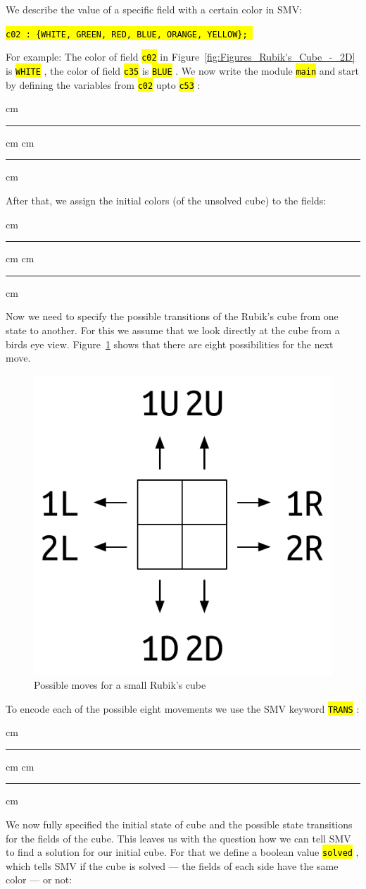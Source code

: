 \documentclass[a4paper, 11pt]{article}
\newcommand{\codeinput}[1]
{
    \vskip 0.3 cm
    {\color{lightgray}\hrule}\vskip 0.3 cm
    {\fontsize{9pt}{11pt}}
    \vskip 0.3 cm{\color{lightgray}\hrule}
    \vskip 0.3 cm
}
\newcommand{\code}[1]
{
    \hl{\texttt{#1}}
}
\begin{document}
We describe the value of a specific field with a certain color in SMV:

\begin{center}
    \code{c02 : \{WHITE, GREEN, RED, BLUE, ORANGE, YELLOW\}; }
\end{center}

For example: The color of field \code{c02} in Figure~\ref{fig:Figures_Rubik's_Cube_-_2D} is \code{WHITE}, the color of field \code{c35} is \code{BLUE}. We now write the module \code{main} and start by defining the variables from \code{c02} upto \code{c53}:

\codeinput{cube_var}

After that, we assign the initial colors (of the unsolved cube) to the fields:

\codeinput{cube_assign}

Now we need to specify the possible transitions of the Rubik's cube from one state to another. For this we assume that we look directly at the cube from a birds eye view. Figure~\ref{fig:Figures_Rubik's_Cube_-_Possibilities} shows that there are eight possibilities for the next move.

\begin{figure}[h]
  \centering
    \includegraphics[width=.4\textwidth]{Figures/Rubik's Cube - Possibilities.pdf}
  \caption{Possible moves for a small Rubik's cube}
  \label{fig:Figures_Rubik's_Cube_-_Possibilities}
\end{figure}

To encode each of the possible eight movements we use the SMV keyword \code{TRANS}:

\codeinput{cube_trans}

We now fully specified the initial state of cube and the possible state transitions for the fields of the cube. This leaves us with the question how we can tell SMV to find a solution for our initial cube. For that we define a boolean value \code{solved}, which tells SMV if the cube is solved — the fields of each side have the same color — or not:
\end{document}
